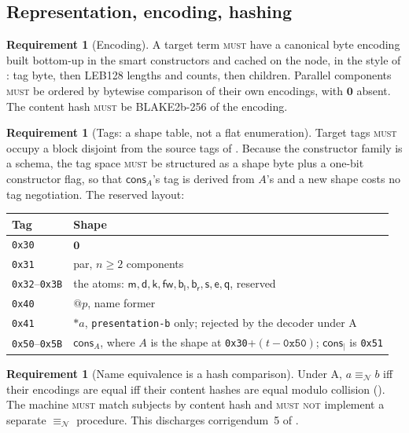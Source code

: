 \documentclass[11pt,a4paper]{article}
\makeatletter
\newcommand{\code}[1]{\texttt{#1}}
\newcommand{\MUST}{\textsc{must}}
\newcommand{\MUSTNOT}{\textsc{must not}}
\newcommand{\quo}[1]{@#1}
\newcommand{\drp}[1]{{*}#1}
\newcommand{\nil}{\mathbf{0}}
\newcommand{\nequiv}{\equiv_{\mathcal{N}}}
\newcommand{\mm}{\mathsf{m}}
\newcommand{\dd}{\mathsf{d}}
\newcommand{\kk}{\mathsf{k}}
\newcommand{\fw}{\mathsf{fw}}
\newcommand{\bl}{\mathsf{b}_{\mathsf{l}}}
\newcommand{\br}{\mathsf{b}_{\mathsf{r}}}
\newcommand{\sy}{\mathsf{s}}
\newcommand{\ev}{\mathsf{e}}
\newcommand{\qq}{\mathsf{q}}
\newcommand{\cons}{\mathsf{cons}}
\theoremstyle{definition}
\newtheorem{requirement}[definition]{Requirement}
\theoremstyle{plain}
\makeatother
\begin{document}
\subsection{Representation, encoding, hashing}

\begin{requirement}[Encoding]\label{req:enc}
A target term \MUST{} have a canonical byte encoding built bottom-up in the
smart constructors and cached on the node, in the style of
\cite[\S6]{k1ndl1ng}: tag byte, then LEB128 lengths and counts, then children.
Parallel components \MUST{} be ordered by bytewise comparison of their own
encodings, with $\nil$ absent. The content hash \MUST{} be BLAKE2b-256 of the
encoding.
\end{requirement}

\begin{requirement}[Tags: a shape table, not a flat enumeration]\label{req:tags}
Target tags \MUST{} occupy a block disjoint from the source tags of
\cite[\S6]{k1ndl1ng}. Because the constructor family is a schema, the tag
space \MUST{} be structured as a shape byte plus a one-bit constructor
flag, so that $\cons_{A}$'s tag is derived from $A$'s and a new shape costs no
tag negotiation. The reserved layout:
\end{requirement}

\begin{center}
\begin{tabular}{@{}ll@{}}
\toprule
Tag & Shape\\
\midrule
\code{0x30} & $\nil$\\
\code{0x31} & par, $n \geq 2$ components\\
\code{0x32}--\code{0x3B} & the atoms: $\mm,\dd,\kk,\fw,\bl,\br,\sy,\ev,\qq$,
  reserved\\
\code{0x40} & $\quo{p}$, name former\\
\code{0x41} & $\drp{a}$, \code{presentation-b} only; rejected by the decoder
  under A\\
\code{0x50}--\code{0x5B} & $\cons_{A}$, where $A$ is the shape at
  \code{0x30}+$(t-\code{0x50})$; $\cons_{\mid}$ is \code{0x51}\\
\bottomrule
\end{tabular}
\end{center}

\begin{requirement}[Name equivalence is a hash comparison]\label{req:neq}
Under A, $a \nequiv b$ iff their encodings are equal iff their content hashes
are equal modulo collision (\cite[Prop.~2.10]{logic}). The machine \MUST{}
match subjects by content hash and \MUSTNOT{} implement a separate $\nequiv$
procedure. This discharges corrigendum~5 of \cite[\S11]{draft3}.
\end{requirement}
\end{document}
